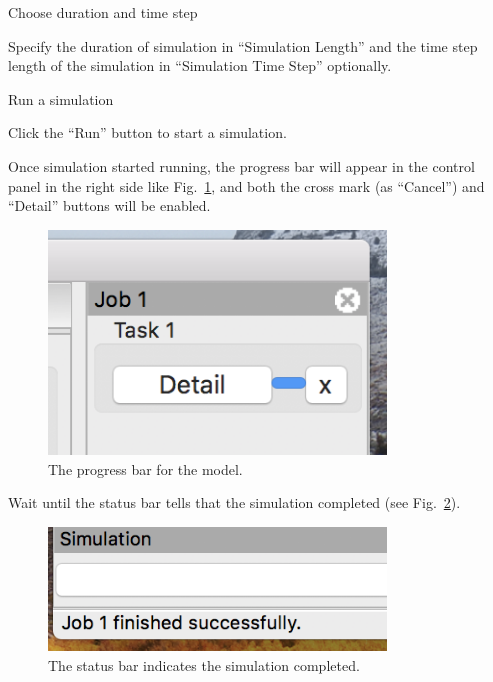 \documentclass[a4paper,10pt]{report}
\begin{document}
\begin{description}
\item[{Choose duration and time step}] 
\end{description}
Specify the duration of simulation in ``Simulation Length'' and the time step
length of the simulation in ``Simulation Time Step'' optionally.

\begin{description}
\item[{Run a simulation}] 
\end{description}
Click the ``Run'' button to start a simulation.

Once simulation started running, the progress bar will appear in the control
panel in the right side like Fig.~\ref{fig:orged76436}, and both the cross mark
(as ``Cancel'') and ``Detail'' buttons will be enabled.

\begin{figure}[htbp]
\centering
\includegraphics[width=0.8\textwidth]{image/hh-progress.png}
\caption{\label{fig:orged76436}The progress bar for the model.}
\end{figure}

Wait until the status bar tells that the simulation completed (see
Fig.~\ref{fig:orgccedfd7}).

\begin{figure}[htbp]
\centering
\includegraphics[width=0.8\textwidth]{image/hh-completed.png}
\caption{\label{fig:orgccedfd7}The status bar indicates the simulation completed.}
\end{figure}
\end{document}
